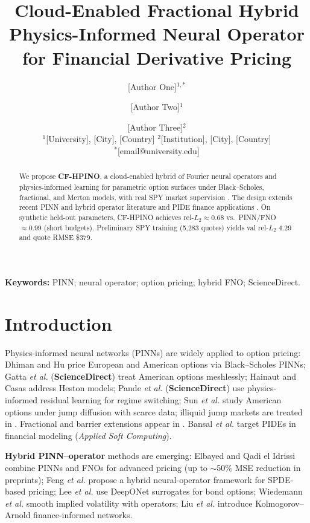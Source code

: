 \documentclass[10pt,a4paper]{article}
\title{\textbf{Cloud-Enabled Fractional Hybrid Physics-Informed Neural Operator for Financial Derivative Pricing}}
\author{[Author One]$^{1,*}$ \and [Author Two]$^{1}$ \and [Author Three]$^{2}$\\[0.4em]
\small $^{1}$[University], [City], [Country] \quad $^{2}$[Institution], [City], [Country]\\
\small $^{*}$[email@university.edu]}
\date{}
\begin{document}
\maketitle

\begin{abstract}
We propose \textbf{CF-HPINO}, a cloud-enabled hybrid of Fourier neural operators and physics-informed learning for parametric option surfaces under Black--Scholes, fractional, and Merton models, with real SPY market supervision \cite{cfhpino2026repo}. The design extends recent PINN and hybrid operator literature \cite{ref01_dhiman2023,ref04_elbayed2025,ref07_feng2025,ref08_hainaut2024} and PIDE finance applications \cite{ref02_bansal2025,ref09_illiquid2025}. On synthetic held-out parameters, CF-HPINO achieves rel-$L_2 \approx 0.68$ vs.\ PINN/FNO $\approx 0.99$ (short budgets). Preliminary SPY training (5,283 quotes) yields val rel-$L_2$ 4.29 and quote RMSE \$379.
\end{abstract}

\noindent\textbf{Keywords:} PINN; neural operator; option pricing; hybrid FNO; ScienceDirect.

\section{Introduction}

Physics-informed neural networks (PINNs) \cite{raissi2019physics} are widely applied to option pricing: Dhiman and Hu \cite{ref01_dhiman2023} price European and American options via Black--Scholes PINNs; Gatta \emph{et al.} \cite{ref03_gatta2023} (\textbf{ScienceDirect}) treat American options meshlessly; Hainaut and Casas \cite{ref08_hainaut2024} address Heston models; Pande \emph{et al.} \cite{ref11_pande2025} (\textbf{ScienceDirect}) use physics-informed residual learning for regime switching; Sun \emph{et al.} \cite{ref12_sun2025} study American options under jump diffusion with scarce data; illiquid jump markets are treated in \cite{ref09_illiquid2025}. Fractional and barrier extensions appear in \cite{ref10_nuugulu2025,ref14_sharma2026,ref05_chen2025barrier}. Bansal \emph{et al.} \cite{ref02_bansal2025} target PIDEs in financial modeling (\emph{Applied Soft Computing}).

\textbf{Hybrid PINN--operator} methods are emerging: Elbayed and Qadi el Idrissi \cite{ref04_elbayed2025} combine PINNs and FNOs for advanced pricing (up to $\sim$50\% MSE reduction in preprints); Feng \emph{et al.} \cite{ref07_feng2025} propose a hybrid neural-operator framework for SPDE-based pricing; Lee \emph{et al.} \cite{ref06_lee2026} use DeepONet surrogates for bond options; Wiedemann \emph{et al.} \cite{ref13_wiedemann2024} smooth implied volatility with operators; Liu \emph{et al.} \cite{ref15_liu2024kan} introduce Kolmogorov--Arnold finance-informed networks.
\end{document}
